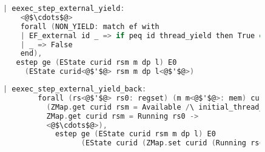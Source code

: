 \begin{figure}
\begin{lstlisting}[language=C]
  | eexec_step_external_yield:
    <@$\cdots$@>
    forall (NON_YIELD: match ef with
    | EF_external id _ => if peq id thread_yield then True else False
    | _ => False 
    end),
   estep ge (EState curid rsm m dp l) E0
     (EState curid<@$'$@> rsm m dp l<@$'$@>)
\end{lstlisting}


\begin{lstlisting}[language=C]
    | eexec_step_external_yield_back:
        forall (rs<@$'$@> rs0: regset) (m m<@$'$@>: mem) curid rsm l l<@$'$@> nb dp d e,
          (ZMap.get curid rsm = Available /\ initial_thread_kctxt ge curid l = Some rs0) \/
          ZMap.get curid rsm = Running rs0 ->
          <@$\cdots$@>),
            estep ge (EState curid rsm m dp l) E0
                  (EState curid (ZMap.set curid (Running rs<@$'$@>) rsm) m<@$'$@> dp l<@$'$@>).
\end{lstlisting}
\end{figure}

%
%
%

